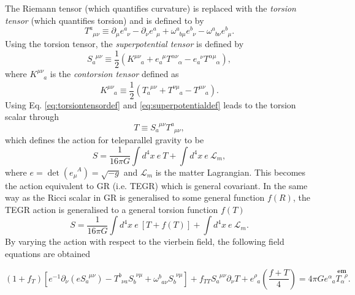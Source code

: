 \documentclass[prl,floatfix,showpacs,twocolumn,preprintnumbers,amsmath,amssymb,superscriptaddress]{revtex4}
\newcommand{\udt}[3]{#1^{#2}_{\phantom{#2}#3}}
\newcommand{\dut}[3]{#1_{#2}^{\phantom{#2}#3}}
\begin{document}
The Riemann tensor (which quantifies curvature) is replaced with the \textit{torsion tensor} (which quantifies torsion) and is defined to by
\begin{equation}\label{eq:torsiontensordef}
\udt{T}{a}{\mu\nu} \equiv \partial_\mu \udt{e}{a}{\nu} - \partial_\nu \udt{e}{a}{\mu} + \udt{\omega}{a}{b\mu}\udt{e}{b}{\nu} - \udt{\omega}{a}{b\nu}\udt{e}{b}{\mu}.
\end{equation}
Using the torsion tensor, the \textit{superpotential tensor} is defined by
\begin{equation}\label{eq:superpotentialdef}
\dut{S}{a}{\mu\nu}\equiv \frac{1}{2}\left(\udt{K}{\mu\nu}{a}+\dut{e}{a}{\mu}\udt{T}{\alpha\nu}{\alpha}-\dut{e}{a}{\nu}\udt{T}{\alpha\mu}{\alpha}\right),
\end{equation}
where $\udt{K}{\mu\nu}{a}$ is the \textit{contorsion tensor} defined as
\begin{equation}\label{eq:contorsiondef}
\udt{K}{\mu\nu}{a} \equiv \dfrac{1}{2} \left(\dut{T}{a}{\mu\nu} + \udt{T}{\nu\mu}{a} - \udt{T}{\mu\nu}{a}\right).
\end{equation}
Using Eq. \eqref{eq:torsiontensordef} and \eqref{eq:superpotentialdef} leads to the torsion scalar through
\begin{equation}\label{eq:torsionscalardef}
T \equiv \dut{S}{a}{\mu\nu}\udt{T}{a}{\mu\nu},
\end{equation}
which defines the action for teleparallel gravity to be
\begin{equation}\label{eq:teleparallel-action}
S = \dfrac{1}{16\pi G} \int d^4x \: e \: T + \int d^4x \: e \: \mathcal{L}_m,
\end{equation}
where $e = \det\left(\dut{e}{\mu}{A}\right) = \sqrt{-g}$ and $\mathcal{L}_m$ is the matter Lagrangian. This becomes the action equivalent to GR (i.e. TEGR) which is general covariant. In the same way as the Ricci scalar in GR is generalised to some general function $f(R)$, the TEGR action is generalised to a general torsion function $f(T)$
\begin{equation} \label{eq:general-action}
S = \dfrac{1}{16\pi G} \int d^4x \: e \: \left[T + f(T)\right] + \int d^4x \: e \: \mathcal{L}_m.
\end{equation}
By varying the action with respect to the vierbein field, the following field equations are obtained \cite{Krssak:2015oua}
\begin{widetext}

\begin{equation}\label{eq:general-field-equations}
\left(1+f_T\right) \left[e^{-1} \partial_\nu \left(e \dut{S}{a}{\mu\nu}\right) - \udt{T}{b}{\nu a} \dut{S}{b}{\nu\mu} + \udt{\omega}{b}{a\nu}\dut{S}{b}{\nu\mu} \right]+ f_{TT} \dut{S}{a}{\mu\nu} \partial_\nu T + \udt{e}{\rho}{a} \left(\dfrac{f+T}{4}\right) = 4\pi G \udt{e}{\alpha}{a} \stackrel{\textbf{em}}{\dut{T}{\alpha}{\rho}}.
\end{equation}

\end{widetext}
\end{document}
